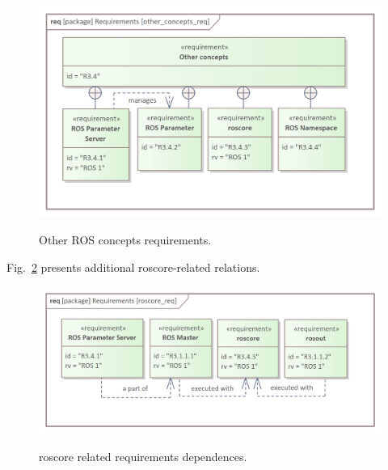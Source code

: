 \begin{figure}[H]
	\centering
	\begin{center}
	{\includegraphics[scale=1.1]{../imgs/requirement_pkg/other_concepts_req.png}}
	\end{center}
	\caption{Other ROS concepts requirements.}
	\label{fig:other_concepts_req}
\end{figure}

Fig.~\ref{fig:roscore_req} presents additional roscore-related relations.


\begin{figure}[H]
	\centering
	\begin{center}
	{\includegraphics[scale=1.1]{../imgs/requirement_pkg/roscore_req.png}}
	\end{center}
	\caption{roscore related requirements dependences.}
	\label{fig:roscore_req}
\end{figure}

\pagebreak


